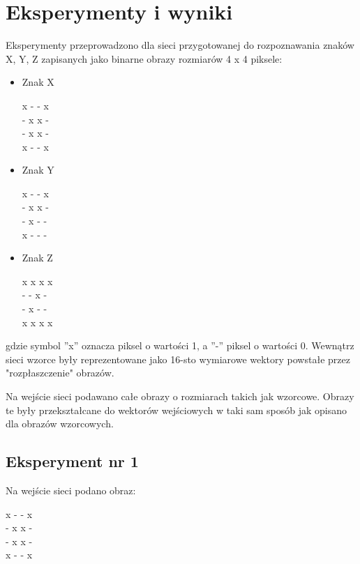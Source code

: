 \documentclass[12pt]{article}
\begin{document}
\clearpage

\section{Eksperymenty i wyniki}

Eksperymenty przeprowadzono dla sieci przygotowanej do rozpoznawania znaków X, Y, Z zapisanych jako binarne obrazy rozmiarów 4 x 4 piksele:
\begin{itemize}
\item 
Znak X

x - - x \\
- x x - \\
- x x - \\
x - - x \\

\item
Znak Y
 
x - - x \\
- x x - \\
- x - - \\
x - - - \\

\item
Znak Z

x x x x \\
- - x - \\
- x - - \\
x x x x \\
\end{itemize}

gdzie symbol ''x'' oznacza piksel o wartości 1, a ''-'' piksel o wartości 0. Wewnątrz sieci wzorce były reprezentowane jako 16-sto wymiarowe wektory powstałe przez "rozpłaszczenie" obrazów.

Na wejście sieci podawano całe obrazy o rozmiarach takich jak wzorcowe. Obrazy te były przekształcane do wektorów wejściowych w taki sam sposób jak opisano dla obrazów wzorcowych.

\clearpage

\subsection{Eksperyment nr 1}

Na wejście sieci podano obraz:

\noindent
x - - x \\
- x x - \\
- x x - \\
x - - x \\
\end{document}
